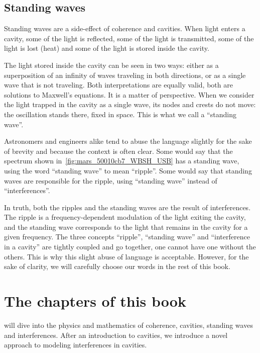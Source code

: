 \subsection{Standing waves}
Standing waves are a side-effect of coherence and cavities.
When light enters a cavity, some of the light is reflected, some of the light is transmitted, some of the light is lost (heat) and some of the light is stored inside the cavity.

The light stored inside the cavity can be seen in two ways:
either as a superposition of an infinity of waves traveling in both directions,
or as a single wave that is not traveling.
Both interpretations are equally valid, both are solutions to Maxwell's equations.
It is a matter of perspective.
When we consider the light trapped in the cavity as a single wave, its nodes and crests do not move: the oscillation stands there, fixed in space.
This is what we call a ``standing wave''.

Astronomers and engineers alike tend to abuse the language slightly for the sake of brevity and because the context is often clear.
Some would say that the spectrum shown in~\cref{fig:mars_50010cb7_WBSH_USB} has a standing wave, using the word ``standing wave'' to mean ``ripple''.
Some would say that standing waves are responsible for the ripple, using ``standing wave'' instead of ``interferences''.

In truth, both the ripples and the standing waves are the result of interferences.
The ripple is a frequency-dependent modulation of the light exiting the cavity, and the standing wave corresponds to the light that remains in the cavity for a given frequency.
The three concepts ``ripple'', ``standing wave'' and ``interference in a cavity'' are tightly coupled and go together, one cannot have one without the others.
This is why this slight abuse of language is acceptable.
However, for the sake of clarity, we will carefully choose our words in the rest of this book.


\section{The chapters of this book}

 will dive into the physics and mathematics of coherence, cavities, standing waves and interferences.
After an introduction to cavities, we introduce a novel approach to modeling interferences in cavities.

